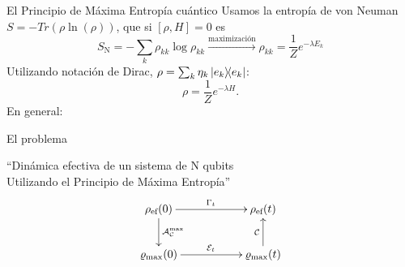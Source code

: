 \begin{frame}{El Principio de Máxima Entropía cuántico}
    Usamos la entropía de von Neuman $S=-Tr(\rho\ln(\rho))$, \pause que si $[\rho,H]=0$ \pause es
    \begin{equation}
        S_{\text{N}}=-\sum_{k}\rho_{kk}\log{\rho_{kk}}\xrightarrow{\text{maximización}}\rho_{kk}=\frac{1}{Z}e^{-\lambda E_{k}}\nonumber
    \end{equation}
    Utilizando notación de Dirac, $\rho=\sum_{k}\eta_{k}\dyad{e_{k}}$:
    \begin{equation}
        \rho=\frac{1}{Z}e^{-\lambda H}.\nonumber
    \end{equation}
    En general:
    \begin{center}
    \end{center}
\end{frame}


\begin{frame}{El problema}
    \begin{center}
        ``Dinámica efectiva de un sistema de N qubits\\
        Utilizando el Principio de Máxima Entropía''
        \begin{displaymath}
            \xymatrix{
              {\rho_{\ef}(0)} \ar[rr]^{\Gamma_{t}} \ar[d]^{\mcA_{\mcC}^{\max}}
              && {\rho_{\ef}(t)}\\
              {\varrho_{\max}(0)} \ar[rr]^{\mcE_{t}}
              && {\varrho_{\max}(t)} \ar[u]^{\mcC}
            }
          \end{displaymath}
    \end{center}
\end{frame}

